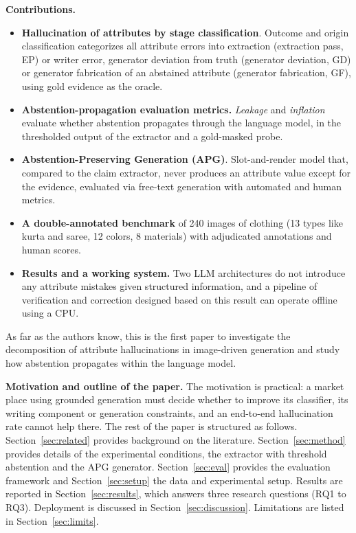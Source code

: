 \documentclass[runningheads]{llncs}
\begin{document}
\noindent\textbf{Contributions.}
\begin{itemize}\setlength{\itemsep}{0pt}\setlength{\topsep}{2pt}\setlength{\parsep}{0pt}
\item \textbf{Hallucination of attributes by stage classification}. Outcome and origin classification categorizes all attribute errors into extraction (extraction pass, EP) or writer error, generator deviation from truth (generator deviation, GD) or generator fabrication of an abstained attribute (generator fabrication, GF), using gold evidence as the oracle.
\item \textbf{Abstention-propagation evaluation metrics.} \emph{Leakage} and \emph{inflation} evaluate whether abstention propagates through the language model, in the thresholded output of the extractor and a gold-masked probe.
\item \textbf{Abstention-Preserving Generation (APG)}. Slot-and-render model that, compared to the claim extractor, never produces an attribute value except for the evidence, evaluated via free-text generation with automated and human metrics.
\item \textbf{A double-annotated benchmark} of 240 images of clothing (13 types like kurta and saree, 12 colors, 8 materials) with adjudicated annotations and human scores.
\item \textbf{Results and a working system.} Two LLM architectures do not introduce any attribute mistakes given structured information, and a pipeline of verification and correction designed based on this result can operate offline using a CPU.
\end{itemize}
As far as the authors know, this is the first paper to investigate the decomposition of attribute hallucinations in image-driven generation and study how abstention propagates within the language model.

\noindent \textbf{Motivation and outline of the paper.} The motivation is practical: a market place using grounded generation must decide whether to improve its classifier, its writing component or generation constraints, and an end-to-end hallucination rate cannot help there. The rest of the paper is structured as follows. Section~\ref{sec:related} provides background on the literature. Section~\ref{sec:method} provides details of the experimental conditions, the extractor with threshold abstention and the APG generator. Section~\ref{sec:eval} provides the evaluation framework and Section~\ref{sec:setup} the data and experimental setup. Results are reported in Section~\ref{sec:results}, which answers three research questions (RQ1 to RQ3). Deployment is discussed in Section~\ref{sec:discussion}. Limitations are listed in Section~\ref{sec:limits}.
\end{document}
